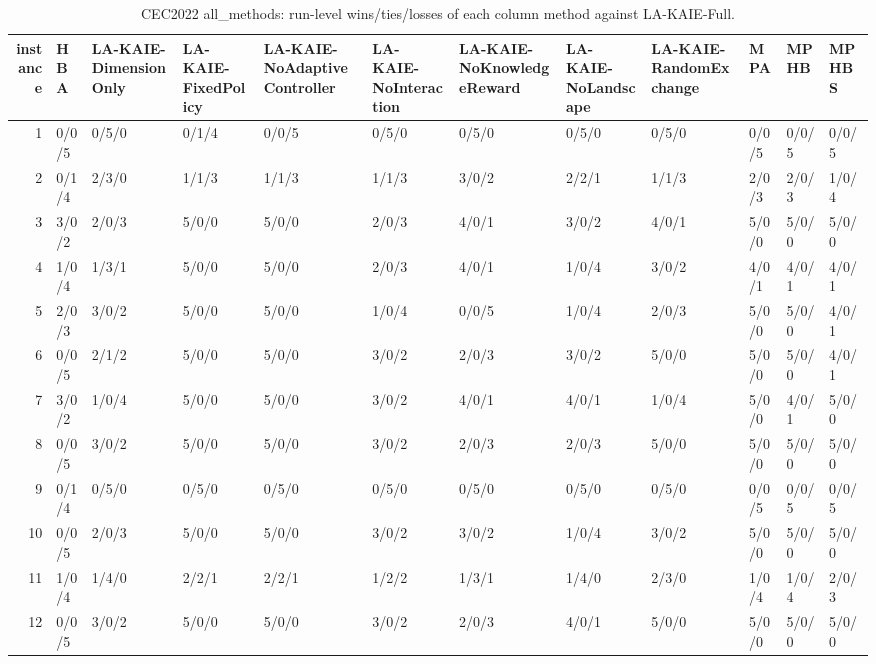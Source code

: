 \begin{table}[t]
\centering
\scriptsize
\caption{CEC2022 all_methods: run-level wins/ties/losses of each column method against LA-KAIE-Full.}
\label{tab:cec2022_all_methods_wtl}
\begin{tabular}{rlllllllllll}
\toprule
instance & HBA & LA-KAIE-DimensionOnly & LA-KAIE-FixedPolicy & LA-KAIE-NoAdaptiveController & LA-KAIE-NoInteraction & LA-KAIE-NoKnowledgeReward & LA-KAIE-NoLandscape & LA-KAIE-RandomExchange & MPA & MPHB & MPHBS \\
\midrule
1 & 0/0/5 & 0/5/0 & 0/1/4 & 0/0/5 & 0/5/0 & 0/5/0 & 0/5/0 & 0/5/0 & 0/0/5 & 0/0/5 & 0/0/5 \\
2 & 0/1/4 & 2/3/0 & 1/1/3 & 1/1/3 & 1/1/3 & 3/0/2 & 2/2/1 & 1/1/3 & 2/0/3 & 2/0/3 & 1/0/4 \\
3 & 3/0/2 & 2/0/3 & 5/0/0 & 5/0/0 & 2/0/3 & 4/0/1 & 3/0/2 & 4/0/1 & 5/0/0 & 5/0/0 & 5/0/0 \\
4 & 1/0/4 & 1/3/1 & 5/0/0 & 5/0/0 & 2/0/3 & 4/0/1 & 1/0/4 & 3/0/2 & 4/0/1 & 4/0/1 & 4/0/1 \\
5 & 2/0/3 & 3/0/2 & 5/0/0 & 5/0/0 & 1/0/4 & 0/0/5 & 1/0/4 & 2/0/3 & 5/0/0 & 5/0/0 & 4/0/1 \\
6 & 0/0/5 & 2/1/2 & 5/0/0 & 5/0/0 & 3/0/2 & 2/0/3 & 3/0/2 & 5/0/0 & 5/0/0 & 5/0/0 & 4/0/1 \\
7 & 3/0/2 & 1/0/4 & 5/0/0 & 5/0/0 & 3/0/2 & 4/0/1 & 4/0/1 & 1/0/4 & 5/0/0 & 4/0/1 & 5/0/0 \\
8 & 0/0/5 & 3/0/2 & 5/0/0 & 5/0/0 & 3/0/2 & 2/0/3 & 2/0/3 & 5/0/0 & 5/0/0 & 5/0/0 & 5/0/0 \\
9 & 0/1/4 & 0/5/0 & 0/5/0 & 0/5/0 & 0/5/0 & 0/5/0 & 0/5/0 & 0/5/0 & 0/0/5 & 0/0/5 & 0/0/5 \\
10 & 0/0/5 & 2/0/3 & 5/0/0 & 5/0/0 & 3/0/2 & 3/0/2 & 1/0/4 & 3/0/2 & 5/0/0 & 5/0/0 & 5/0/0 \\
11 & 1/0/4 & 1/4/0 & 2/2/1 & 2/2/1 & 1/2/2 & 1/3/1 & 1/4/0 & 2/3/0 & 1/0/4 & 1/0/4 & 2/0/3 \\
12 & 0/0/5 & 3/0/2 & 5/0/0 & 5/0/0 & 3/0/2 & 2/0/3 & 4/0/1 & 5/0/0 & 5/0/0 & 5/0/0 & 5/0/0 \\
\bottomrule
\end{tabular}
\end{table}
